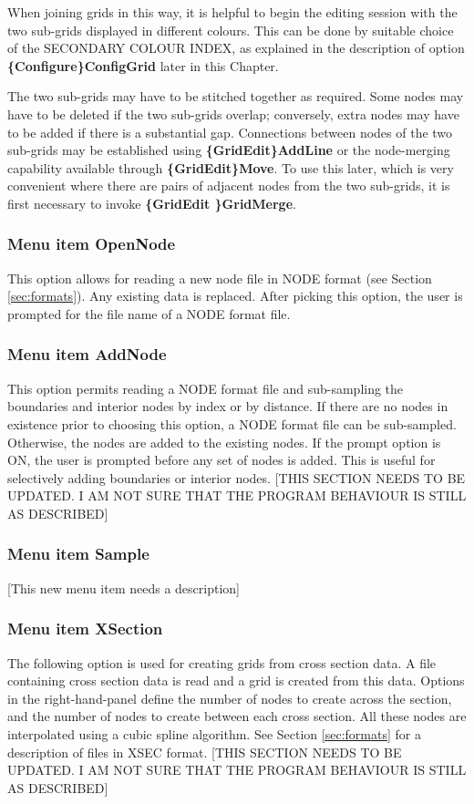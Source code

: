 \documentclass{article}
\begin{document}
When joining grids in this way, it is helpful to begin the editing session with the two sub-grids displayed in different colours. This can be done by suitable choice of the SECONDARY COLOUR INDEX, as explained in the description of option \textbf{\{Configure\}ConfigGrid} later in this Chapter.

The two sub-grids may have to be stitched together as required. Some nodes may have to be deleted if the two sub-grids overlap; conversely, extra nodes may have to be added if there is a substantial gap. Connections between nodes of the two sub-grids may be established using \textbf{\{GridEdit\}AddLine} or the node-merging capability available through \textbf{\{GridEdit\}Move}. To use this later, which is very convenient where there are pairs of adjacent nodes from the two sub-grids, it is first necessary to invoke \textbf{\{GridEdit \}GridMerge}.

\subsubsection[Menu item OpenNode]{Menu item OpenNode}
This option allows for reading a new node file in NODE format (see Section \ref{sec:formats}). Any existing data is replaced. After picking this option, the user is prompted for the file name of a NODE format file.

\subsubsection[Menu item AddNode]{Menu item AddNode}
This option permits reading a NODE format file and sub-sampling the boundaries and interior nodes by index or by distance. If there are no nodes in existence prior to choosing this option, a NODE format file can be sub-sampled. Otherwise, the nodes are added to the existing nodes. If the prompt option is ON, the user is prompted before any set of nodes is added. This is useful for selectively adding boundaries or interior nodes. [THIS SECTION NEEDS TO BE UPDATED.  I AM NOT SURE THAT THE PROGRAM BEHAVIOUR IS STILL AS DESCRIBED]

\subsubsection{Menu item Sample}
[This new menu item needs a description]

\subsubsection[Menu item CrossSection]{Menu item XSection}
The following option is used for creating grids from cross section data. A file containing cross section data is read and a grid is created from this data. Options in the right-hand-panel define the number of nodes to create across the section, and the number of nodes to create between each cross section. All these nodes are interpolated using a cubic spline algorithm. See Section \ref{sec:formats} for a description of files in XSEC format.  [THIS SECTION NEEDS TO BE UPDATED.  I AM NOT SURE THAT THE PROGRAM BEHAVIOUR IS STILL AS DESCRIBED]
\end{document}
